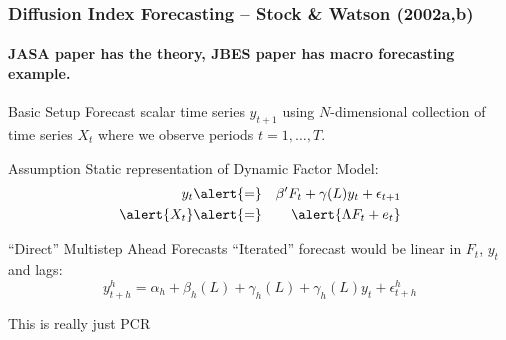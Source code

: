 \documentclass[handout]{beamer}
\begin{document}
\begin{frame}[c]\frametitle{Diffusion Index Forecasting -- Stock \& Watson (2002a,b)}
 \framesubtitle{JASA paper has the theory, JBES paper has macro forecasting example.}

\begin{block}
	{Basic Setup}
	Forecast scalar time series $y_{t+1}$ using $N$-dimensional collection of time series $X_t$ where we observe periods $t = 1, \hdots, T$.
\end{block}

\begin{block}
	{Assumption}
	Static representation of Dynamic Factor Model:
	\begin{eqnarray*}
		y_{t}&\alert{=}& \beta' F_t + \gamma(L)y_t + \epsilon_{t+1}\\
		\alert{X_t} &\alert{=}& \alert{\Lambda F_t + e_t}
	\end{eqnarray*}
\end{block}

\begin{block}
	{``Direct'' Multistep Ahead Forecasts}
	``Iterated'' forecast would be linear in $F_t$, $y_t$ and lags:
	$$y_{t+h}^h = \alpha_h + \beta_h(L) + \gamma_h(L)+ \gamma_h(L)y_t + \epsilon^h_{t+h}$$
\end{block}
\end{frame}

\begin{frame}
\begin{center}
	\Huge This is really just PCR
\end{center}
\end{frame}
\end{document}

